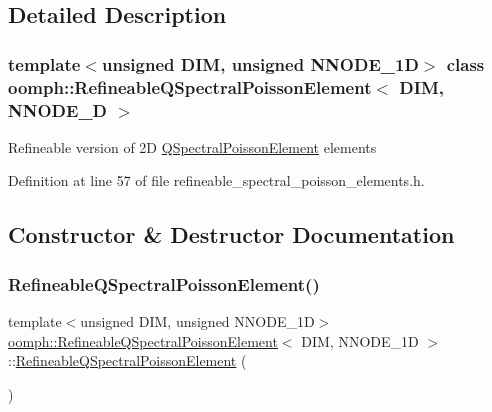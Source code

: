 \subsection{Detailed Description}
\subsubsection*{template$<$unsigned D\+IM, unsigned N\+N\+O\+D\+E\+\_\+1D$>$\newline
class oomph\+::\+Refineable\+Q\+Spectral\+Poisson\+Element$<$ D\+I\+M, N\+N\+O\+D\+E\+\_\+D $>$}

Refineable version of 2D \hyperlink{classoomph_1_1QSpectralPoissonElement}{Q\+Spectral\+Poisson\+Element} elements 

Definition at line 57 of file refineable\+\_\+spectral\+\_\+poisson\+\_\+elements.\+h.



\subsection{Constructor \& Destructor Documentation}
\mbox{\label{classoomph_1_1RefineableQSpectralPoissonElement_a861d8b8c338f6719a2adea84d24eb9a8}} 
\subsubsection{\texorpdfstring{Refineable\+Q\+Spectral\+Poisson\+Element()}{RefineableQSpectralPoissonElement()}\hspace{0.1cm}{\footnotesize\ttfamily [1/2]}}
{\footnotesize\ttfamily template$<$unsigned D\+IM, unsigned N\+N\+O\+D\+E\+\_\+1D$>$ \\
\hyperlink{classoomph_1_1RefineableQSpectralPoissonElement}{oomph\+::\+Refineable\+Q\+Spectral\+Poisson\+Element}$<$ D\+IM, N\+N\+O\+D\+E\+\_\+1D $>$\+::\hyperlink{classoomph_1_1RefineableQSpectralPoissonElement}{Refineable\+Q\+Spectral\+Poisson\+Element} (\begin{DoxyParamCaption}{ }\end{DoxyParamCaption})\hspace{0.3cm}{\ttfamily [inline]}}



